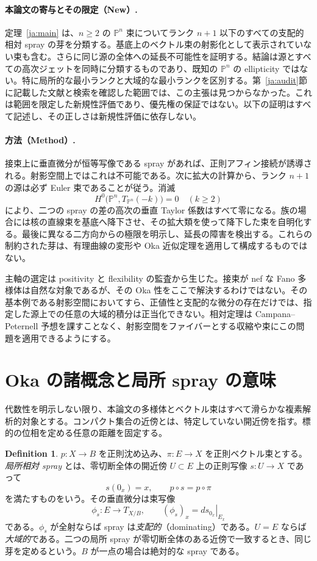 \documentclass[12pt]{amsart}
\theoremstyle{definition}
\newtheorem{defn}[thm]{Definition}
\theoremstyle{remark}
\numberwithin{equation}{section}
\newcommand{\mP}{\mathbb{P}}
\begin{document}
\paragraph{本論文の寄与とその限定（New）.}
定理~\ref{ja:main} は、$n\geq2$ の $\mP^n$ 束についてランク $n+1$ 以下のすべての支配的相対 spray の芽を分類する。基底上のベクトル束の射影化として表示されていない束も含む。さらに同じ源の全体への延長不可能性を証明する。結論は源とすべての高次ジェットを同時に分類するものであり、既知の $\mP^n$ の ellipticity ではない。特に局所的な最小ランクと大域的な最小ランクを区別する。第~\ref{ja:audit}節に記載した文献と検索を確認した範囲では、この主張は見つからなかった。これは範囲を限定した新規性評価であり、優先権の保証ではない。以下の証明はすべて記述し、その正しさは新規性評価に依存しない。

\paragraph{方法（Method）.}
接束上に垂直微分が恒等写像である spray があれば、正則アフィン接続が誘導される。射影空間上ではこれは不可能である。次に拡大の計算から、ランク $n+1$ の源は必ず Euler 束であることが従う。消滅
\[
H^0\bigl(\mP^n,T_{\mP^n}(-k)\bigr)=0\quad(k\geq2)
\]
により、二つの spray の差の高次の垂直 Taylor 係数はすべて零になる。族の場合には核の直線束を基底へ降下させ、その拡大類を使って降下した束を自明化する。最後に異なる二方向からの極限を明示し、延長の障害を検出する。これらの制約された芽は、有理曲線の変形や Oka 近似定理を適用して構成するものではない。

主軸の選定は positivity と flexibility の監査から生じた。接束が nef な Fano 多様体は自然な対象であるが、その Oka 性をここで解決するわけではない。その基本例である射影空間においてすら、正値性と支配的な微分の存在だけでは、指定した源上での任意の大域的積分は正当化できない。相対定理は Campana--Peternell 予想を課すことなく、射影空間をファイバーとする収縮や束にこの問題を適用できるようにする。

\section{Oka の諸概念と局所 spray の意味}\label{ja:notions}
代数性を明示しない限り、本論文の多様体とベクトル束はすべて滑らかな複素解析的対象とする。コンパクト集合の近傍とは、特定していない開近傍を指す。標的の位相を定める任意の距離を固定する。

\begin{defn}\label{ja:spraydef}
$p:X\to B$ を正則沈め込み、$\pi:E\to X$ を正則ベクトル束とする。\emph{局所相対 spray} とは、零切断全体の開近傍 $U\subset E$ 上の正則写像 $s:U\to X$ であって
\[
s(0_x)=x,\qquad p\circ s=p\circ\pi
\]
を満たすものをいう。その垂直微分は束写像
\[
\phi_s:E\longrightarrow T_{X/B},\qquad
(\phi_s)_x=\left.ds_{0_x}\right|_{E_x}
\]
である。$\phi_s$ が全射ならば spray は\emph{支配的}（dominating）である。$U=E$ ならば\emph{大域的}である。二つの局所 spray が零切断全体のある近傍で一致するとき、同じ芽を定めるという。$B$ が一点の場合は絶対的な spray である。
\end{defn}
\end{document}
